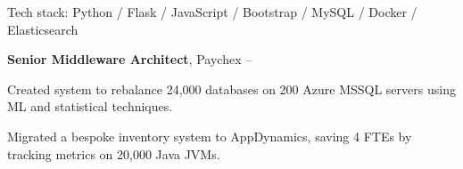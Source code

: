 \documentclass[MMMMyyyy,nonstopmode]{simpleresumecv_stacked}
\newcommand{\tech}[1]{\Gap Tech stack: #1}
\newcommand{\techsep}{/ }
\newcommand{\comment}[1]{\ignorespaces} %
\newif\ifLOCATION
\begin{document}
\begin{Body}
\begin{Detail}

\tech{Python \techsep Flask \techsep JavaScript \techsep Bootstrap \techsep MySQL \techsep Docker \techsep Elasticsearch}

\end{Detail}

\BigGap


\Entry
\textbf{Senior Middleware Architect}, Paychex
\hfill
{} -- 

\ifLOCATION
\hfill
Rochester, New York
\fi

\begin{Detail}

\iftrue
\BulletItem
Created system to rebalance 24,000 databases \comment{among} on 200 Azure MSSQL servers using ML and statistical techniques.


\BulletItem
Migrated a bespoke inventory system to AppDynamics, saving 4 FTEs by tracking metrics on 20,000 Java JVMs.



\end{Detail}
\end{Body}
\end{document}

